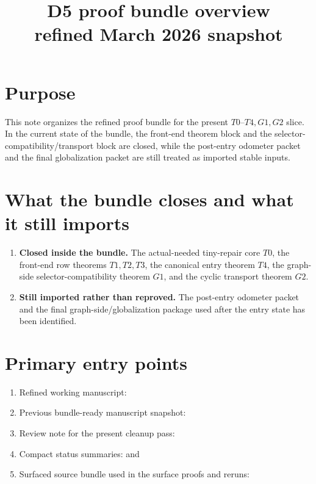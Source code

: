 \documentclass[11pt]{article}
\title{D5 proof bundle overview\\refined March 2026 snapshot}
\author{}
\date{}
\begin{document}
\maketitle

\section*{Purpose}

This note organizes the refined proof bundle for the present
\(T0\)--\(T4,G1,G2\) slice.
In the current state of the bundle, the front-end theorem block and the
selector-compatibility/transport block are closed, while the post-entry
odometer packet and the final globalization packet are still treated as imported
stable inputs.

\section{What the bundle closes and what it still imports}

\begin{enumerate}[leftmargin=2.6em]
\item \textbf{Closed inside the bundle.}
      The actual-needed tiny-repair core \(T0\), the front-end row theorems
      \(T1,T2,T3\), the canonical entry theorem \(T4\), the graph-side
      selector-compatibility theorem \(G1\), and the cyclic transport theorem
      \(G2\).
\item \textbf{Still imported rather than reproved.}
      The post-entry odometer packet and the final graph-side/globalization
      package used after the entry state has been identified.
\end{enumerate}

\section{Primary entry points}

\begin{enumerate}[leftmargin=2.6em]
\item Refined working manuscript:
\item Previous bundle-ready manuscript snapshot:
\item Review note for the present cleanup pass:
\item Compact status summaries:
       and
\item Surfaced source bundle used in the surface proofs and reruns:
\end{enumerate}
\end{document}
